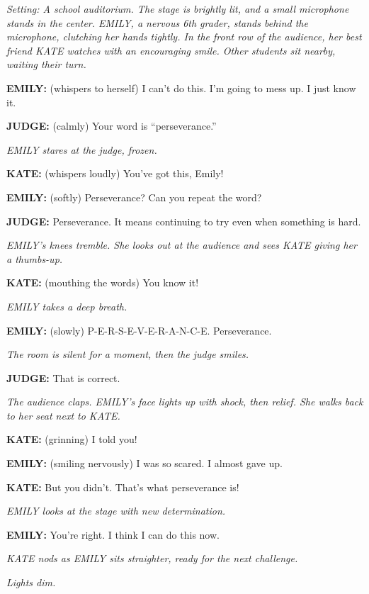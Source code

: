 \documentclass[12pt]{article}
\begin{document}
\begin{tcolorbox}[colframe=black!60, colback=white, 
coltitle=black, colbacktitle=black!15, fonttitle=\bfseries\Large, 
title=Text: The Spelling Bee, halign title=center, left=10pt, right=10pt, top=10pt, bottom=15pt]

\textit{Setting: A school auditorium. The stage is brightly lit, and a small microphone stands in the center. EMILY, a nervous 6th grader, stands behind the microphone, clutching her hands tightly. In the front row of the audience, her best friend KATE watches with an encouraging smile. Other students sit nearby, waiting their turn.}

\textbf{EMILY:} (whispers to herself) I can’t do this. I’m going to mess up. I just know it.

\textbf{JUDGE:} (calmly) Your word is “perseverance.”

\textit{EMILY stares at the judge, frozen.}

\textbf{KATE:} (whispers loudly) You’ve got this, Emily!

\textbf{EMILY:} (softly) Perseverance? Can you repeat the word?

\textbf{JUDGE:} Perseverance. It means continuing to try even when something is hard.

\textit{EMILY’s knees tremble. She looks out at the audience and sees KATE giving her a thumbs-up.}

\textbf{KATE:} (mouthing the words) You know it!

\textit{EMILY takes a deep breath.}

\textbf{EMILY:} (slowly) P-E-R-S-E-V-E-R-A-N-C-E. Perseverance.

\textit{The room is silent for a moment, then the judge smiles.}

\textbf{JUDGE:} That is correct.

\textit{The audience claps. EMILY’s face lights up with shock, then relief. She walks back to her seat next to KATE.}

\textbf{KATE:} (grinning) I told you!

\textbf{EMILY:} (smiling nervously) I was so scared. I almost gave up.

\textbf{KATE:} But you didn’t. That’s what perseverance is!

\textit{EMILY looks at the stage with new determination.}

\textbf{EMILY:} You’re right. I think I can do this now.

\textit{KATE nods as EMILY sits straighter, ready for the next challenge.}

\textit{Lights dim.}

\end{tcolorbox}
\end{document}
